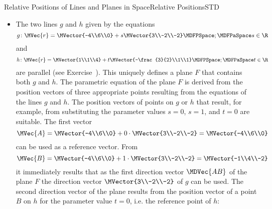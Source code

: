 \begin{MXContent}{Relative Positions of Lines and Planes in Space}{Relative Positions}{STD}
\begin{MExample}
\begin{itemize}
\[\]
Hence, a possible equation of the plane $E$ in parametric form is given by
\[
 E\colon \MVec{r}=\MVector{1\\2\\4}+\mu\MVector{-5\\10\\-15}+\nu\MVector{6\\-4\\11}\MDFPSpace;\MDFPaSpace \mu,\nu\in\R\MDFPeriod
\]

\item The two lines $g$ and $h$ given by the equations 
\[
 g\colon\MVec{r}=\MVector{-4\\6\\0}+s\MVector{3\\-2\\-2}\MDFPSpace;\MDFPaSpace s\in\R 
\]
and
\[
 h\colon\MVec{r}=\MVector{1\\1\\4}+t\MVector{-\frac{3}{2}\\1\\1}\MDFPSpace;\MDFPaSpace t\in\R 
\]
are parallel (see Exercise~). This uniquely defines a plane $F$ that contains both 
$g$ and $h$. The parametric equation of the plane $F$ is derived from the position vectors of 
three appropriate points resulting from the equations of the lines $g$ and $h$. The position vectors of 
points on $g$ or $h$ that result, for example, from substituting the parameter values $s=0$, $s=1$, and $t=0$ are suitable.
The first vector
\[
 \MVec{A}=\MVector{-4\\6\\0}+0\cdot\MVector{3\\-2\\-2}=\MVector{-4\\6\\0} 
\]
can be used as a reference vector. From  
\[
 \MVec{B}=\MVector{-4\\6\\0}+1\cdot\MVector{3\\-2\\-2}=\MVector{-1\\4\\-2}
\]
it immediately results that as the first direction vector $\MDVec{A B}$ of the plane $F$ the direction 
vector $\MVector{3\\-2\\-2}$ of $g$ can be used. The second direction vector of the plane
results from the position vector of a point $B$ on $h$ for the parameter value $t=0$, 
i.e. the reference point of $h$:

\end{itemize}
\end{MExample}
\end{MXContent}
